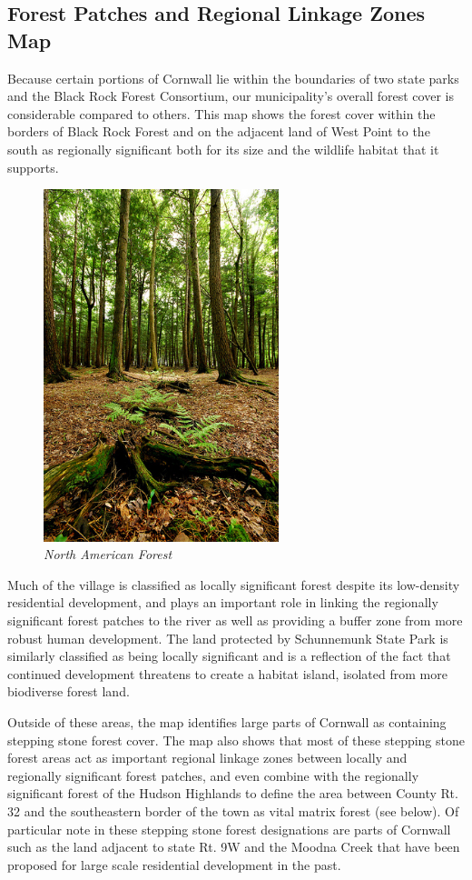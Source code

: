 \subsection*{Forest Patches and Regional Linkage Zones Map}\label{subsec:forestpatchesandreglinkagezonesmap}
Because certain portions of Cornwall lie within the boundaries of two state
parks and the Black Rock Forest Consortium, our municipality’s overall forest
cover is considerable compared to others. This map shows the forest cover
within the borders of Black Rock Forest and on the adjacent land of West Point
to the south as regionally significant both for its size and the wildlife
habitat that it supports.
\begin{figure}
    \includegraphics[width=6.85cm, keepaspectratio]{images/forest.jpg}
    \caption{\textit{North American Forest}\label{fig:forest}}
\end{figure}
Much of the village is classified as locally significant forest despite its
low-density residential development, and plays an important role in linking the
regionally significant forest patches to the river as well as providing a
buffer zone from more robust human development. The land protected by
Schunnemunk State Park is similarly classified as being locally significant and
is a reflection of the fact that continued development threatens to create a
habitat island, isolated from more biodiverse forest land.

Outside of these areas, the map identifies large parts of Cornwall as containing
stepping stone forest cover. The map also shows that most of these stepping
stone forest areas act as important regional linkage zones between locally and
regionally significant forest patches, and even combine with the regionally
significant forest of the Hudson Highlands to define the area between County
Rt. 32 and the southeastern border of the town as vital matrix forest (see
below). Of particular note in these stepping stone forest designations are
parts of Cornwall such as the land adjacent to state Rt. 9W and the Moodna
Creek that have been proposed for large scale residential development in the
past.
\label{map:forestpatches}

